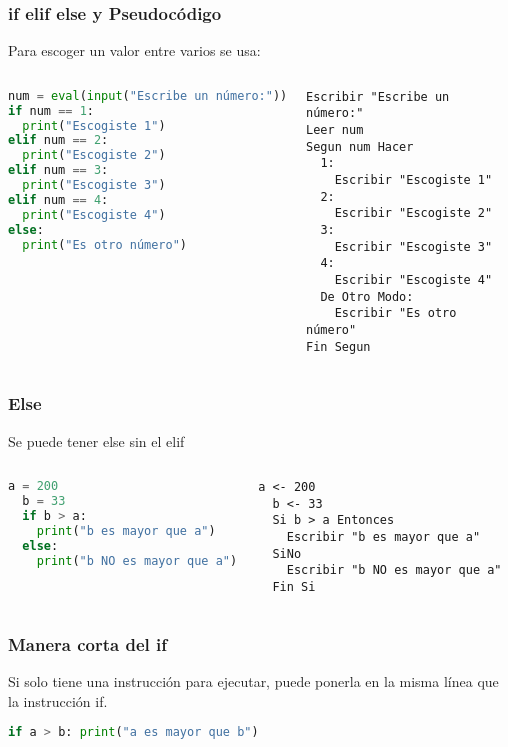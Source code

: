 \begin{frame}[fragile]
  \frametitle{if elif else y Pseudocódigo}

  Para escoger un valor entre varios se usa:
  \begin{columns}
      \begin{lstlisting}[language=Python]
num = eval(input("Escribe un número:"))
if num == 1:
  print("Escogiste 1")
elif num == 2:
  print("Escogiste 2")
elif num == 3:
  print("Escogiste 3")
elif num == 4:
  print("Escogiste 4")
else:
  print("Es otro número")\end{lstlisting}
    \pausa
      \begin{lstlisting}[style=pseudocodigo]
Escribir "Escribe un número:"
Leer num
Segun num Hacer
  1:
    Escribir "Escogiste 1"
  2:
    Escribir "Escogiste 2"
  3:
    Escribir "Escogiste 3"
  4:
    Escribir "Escogiste 4"
  De Otro Modo:
    Escribir "Es otro número"
Fin Segun\end{lstlisting}
  \end{columns}
\end{frame}

\begin{frame}[fragile]
  \frametitle{Else}

  Se puede tener \textcolor{codeKeyword}{else} sin el
  \textcolor{codeKeyword}{elif}

  \begin{columns}
      \begin{lstlisting}[language=Python]
  a = 200
  b = 33
  if b > a:
    print("b es mayor que a")
  else:
    print("b NO es mayor que a")
      \end{lstlisting}
    \pausa
      \begin{lstlisting}[style=pseudocodigo]
  a <- 200
  b <- 33
  Si b > a Entonces
    Escribir "b es mayor que a"
  SiNo
    Escribir "b NO es mayor que a"
  Fin Si
      \end{lstlisting}
  \end{columns}
\end{frame}

\begin{frame}[fragile]
  \frametitle{Manera corta del if}

  Si solo tiene una instrucción para ejecutar, puede ponerla en la misma
  línea que la instrucción if.

  \vspace{\baselineskip}
  \begin{lstlisting}[language=Python]
  if a > b: print("a es mayor que b")
  \end{lstlisting}
\end{frame}

